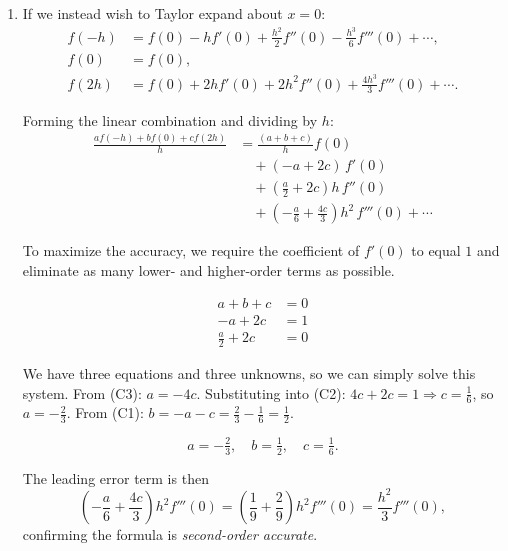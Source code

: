 \documentclass[11pt]{article}
\begin{document}
{\begin{enumerate}[a)]
\begin{enumerate}[1)]
\item If we instead wish to Taylor expand about $x=0$:
\begin{align*}
f(-h) &= f(0) - hf'(0) + \tfrac{h^2}{2}f''(0) - \tfrac{h^3}{6}f'''(0)
         + \cdots, \\
f(0)  &= f(0), \\
f(2h) &= f(0) + 2hf'(0) + 2h^2f''(0) + \tfrac{4h^3}{3}f'''(0)
         + \cdots.
\end{align*}

Forming the linear combination and dividing by $h$:
\begin{align*}
\frac{af(-h)+bf(0)+cf(2h)}{h}
  &= \frac{(a+b+c)}{h}f(0) \\
  &\quad + (-a+2c)\,f'(0) \\
  &\quad + \left(\frac{a}{2}+2c\right)h\,f''(0) \\
  &\quad + \left(-\frac{a}{6}+\frac{4c}{3}\right)h^2\,f'''(0)
    + \cdots
\end{align*}

To maximize the accuracy, we require the coefficient of $f'(0)$ to equal $1$ and eliminate as many
lower- and higher-order terms as possible.

\begin{align}
a + b + c &= 0 \tag{C1}\\
-a + 2c   &= 1 \tag{C2}\\
\frac{a}{2} + 2c &= 0 \tag{C3}
\end{align}

We have three equations and three unknowns, so we can simply solve this system. From (C3): $a = -4c$.
Substituting into (C2): $4c+2c = 1 \Rightarrow c = \tfrac{1}{6}$,
so $a = -\tfrac{2}{3}$.
From (C1): $b = -a-c = \tfrac{2}{3}-\tfrac{1}{6} = \tfrac{1}{2}$.

\[
  \boxed{a = -\tfrac{2}{3},\quad b = \tfrac{1}{2},\quad c = \tfrac{1}{6}.}
\]

The leading error term is then
\[
  \left(-\frac{a}{6}+\frac{4c}{3}\right)h^2 f'''(0)
  = \left(\frac{1}{9}+\frac{2}{9}\right)h^2 f'''(0)
  = \frac{h^2}{3}f'''(0),
\]
confirming the formula is \textit{second-order accurate}.
\end{enumerate}


\end{enumerate}}
\end{document}
